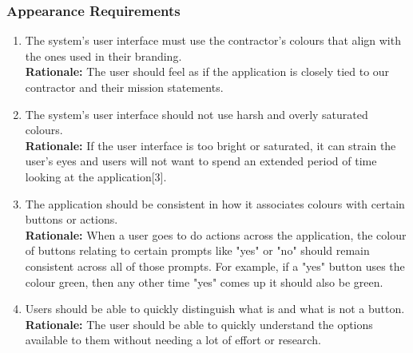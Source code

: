 \documentclass[]{article}
\begin{document}
\subsubsection{Appearance Requirements}
\label{ssub:appearance_requirements}
\begin{enumerate}[label={LF-A\arabic*.}]
	\item The system's user interface must use the contractor's colours that align with the ones used in their branding.\\
	\textbf{Rationale:} The user should feel as if the application is closely tied to our contractor and their mission statements.
	\item The system's user interface should not use harsh and overly saturated colours.\\
	\textbf{Rationale:} If the user interface is too bright or saturated, it can strain the user's eyes and users will not want to spend an extended period of time looking at the application[3]. 
	\item The application should be consistent in how it associates colours with certain buttons or actions.\\
	\textbf{Rationale:} When a user goes to do actions across the application, the colour of buttons relating to certain prompts like "yes" or "no" should remain consistent across all of those prompts. For example, if a "yes" button uses the colour green, then any other time "yes" comes up it should also be green.
	\item Users should be able to quickly distinguish what is and what is not a button.\\
	\textbf{Rationale:} The user should be able to quickly understand the options available to them without needing a lot of effort or research. 
\end{enumerate}
\end{document}
